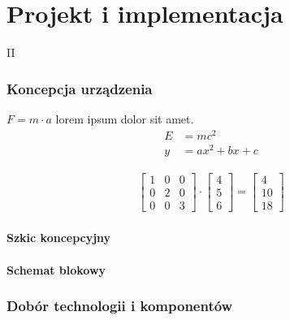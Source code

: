 \part{Projekt i implementacja}{II}
\noindent \lipsum[1-5]

\clearpage\section{Koncepcja urządzenia}
    \noindent \lipsum[2] $F = m \cdot a$ lorem ipsum dolor sit amet.
    \begin{align}
        E & = mc^2 \\
        y & = ax^2 + bx + c
    \end{align}

    \lipsum[3]
    \begin{align}
        \begin{bmatrix}
            1 & 0 & 0 \\
            0 & 2 & 0 \\
            0 & 0 & 3
        \end{bmatrix} \cdot
        \begin{bmatrix}
            4 \\
            5 \\
            6
        \end{bmatrix} =
        \begin{bmatrix}
            4  \\
            10 \\
            18
        \end{bmatrix}
    \end{align}


    \subsection{Szkic koncepcyjny}
        \noindent \lipsum[1]

    \subsection{Schemat blokowy}
        \noindent \lipsum[1]

\clearpage\section{Dobór technologii i komponentów} 
    \noindent \lipsum[1]

